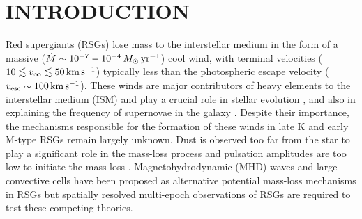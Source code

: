 \documentclass[iop]{emulateapj}
\begin{document}
\section{INTRODUCTION}
Red supergiants (RSGs) lose mass to the interstellar medium in the form of a massive ($\dot{M} \sim 10^{-7} - 10^{-4}\,M_{\odot}\,\rm{yr}^{-1}$) cool wind, with terminal velocities ($10\lesssim v_{\infty}\lesssim 50\,{\rm{km}}\,\rm{s}^{-1}$) typically less than the photospheric escape velocity  ($v_{\rm{esc}} \sim 100\,\rm{km}\,\rm{s}^{-1}$). These winds are major contributors of heavy elements to the interstellar medium (ISM) and play a crucial role in stellar evolution \citep{chiosi_1986}, and also in explaining the frequency of supernovae in the galaxy \citep[e.g.,][]{van_loon_2010}. Despite their importance, the mechanisms responsible for the formation of these winds in late K and early M-type RSGs remain largely unknown. Dust is observed too far from the star to play a significant role in the mass-loss process \citep{danchi_1994} and pulsation amplitudes are too low to initiate the mass-loss \citep{smith_1989}. Magnetohydrodynamic (MHD) waves \citep[e.g.,][]{thirumalai_2012} and large convective cells \citep[e.g.,][]{josselin_2007} have been proposed as alternative potential mass-loss mechanisms in RSGs but spatially resolved multi-epoch observations of RSGs are required to test these competing theories.
\end{document}
